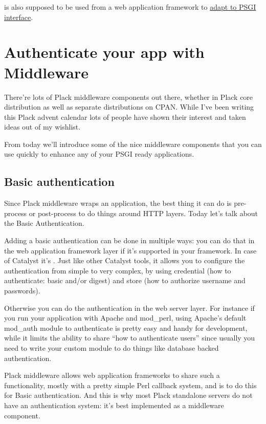  is also supposed to be used from a web application
framework to
\href{http://advent.plackperl.org/2009/12/day-8-adapting-web-frameworks-to-psgi.html}{adapt
to PSGI interface}.

\chapter{Authenticate your app with
Middleware}\label{day-15-authenticate-your-app-with-middleware}

There're lots of Plack middleware components out there, whether in Plack
core distribution as well as separate distributions on CPAN. While I've
been writing this Plack advent calendar lots of people have shown their
interest and taken ideas out of my wishlist.

From today we'll introduce some of the nice middleware components that
you can use quickly to enhance any of your PSGI ready applications.

\section{Basic authentication}\label{basic-authentication}

Since Plack middleware wraps an application, the best thing it can do is
pre-process or post-process to do things around HTTP layers. Today let's
talk about the Basic Authentication.

Adding a basic authentication can be done in multiple ways: you can do
that in the web application framework layer if it's supported in your
framework. In case of Catalyst it's
\href{http://search.cpan.org/perldoc?Catalyst::Authentication::Credential::HTTP}{}.
Just like other Catalyst tools, it allows you to configure the
authentication from simple to very complex, by using credential (how to
authenticate: basic and/or digest) and store (how to authorize username
and passwords).

Otherwise you can do the authentication in the web server layer. For
instance if you run your application with Apache and mod\_perl, using
Apache's default mod\_auth module to authenticate is pretty easy and
handy for development, while it limits the ability to share ``how to
authenticate users'' since usually you need to write your custom module
to do things like database backed authentication.

Plack middleware allows web application frameworks to share such a
functionality, mostly with a pretty simple Perl callback system, and
 is to do this for Basic authentication.
And this is why most Plack standalone servers do not have an
authentication system: it's best implemented as a middleware component.


